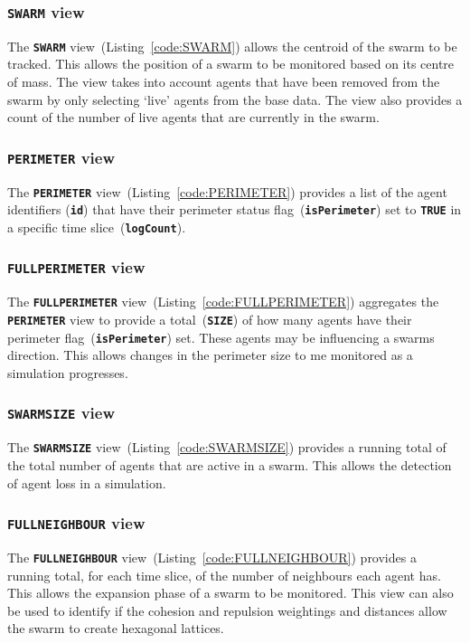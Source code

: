 \subsubsection{\texttt{\textbf{SWARM}} view}
The \texttt{\textbf{SWARM}} view~(Listing~\ref{code:SWARM}) allows the centroid of the swarm to be tracked. This allows the position of a swarm to be monitored based on its centre of mass. The view takes into account agents that have been removed from the swarm by only selecting `live' agents from the base data. The view also provides a count of the number of live agents that are currently in the swarm.

\subsubsection{\texttt{\textbf{PERIMETER}} view}
The \texttt{\textbf{PERIMETER}} view~(Listing~\ref{code:PERIMETER}) provides a list of the agent identifiers (\texttt{\textbf{id}}) that have their perimeter status flag~(\texttt{\textbf{isPerimeter}}) set to \texttt{\textbf{TRUE}} in a specific time slice~(\texttt{\textbf{logCount}}).

\subsubsection{\texttt{\textbf{FULLPERIMETER}} view}
The \texttt{\textbf{FULLPERIMETER}} view~(Listing~\ref{code:FULLPERIMETER}) aggregates the \texttt{\textbf{PERIMETER}} view to provide a total~(\texttt{\textbf{SIZE}}) of how many agents have their perimeter flag~(\texttt{\textbf{isPerimeter}}) set. These agents may be influencing a swarms direction. This allows changes in the perimeter size to me monitored as a simulation progresses.

\subsubsection{\texttt{\textbf{SWARMSIZE}} view}
The \texttt{\textbf{SWARMSIZE}} view~(Listing~\ref{code:SWARMSIZE}) provides a running total of the total number of agents that are active in a swarm. This allows the detection of agent loss in a simulation.

\subsubsection{\texttt{\textbf{FULLNEIGHBOUR}} view}
The \texttt{\textbf{FULLNEIGHBOUR}} view~(Listing~\ref{code:FULLNEIGHBOUR}) provides a running total, for each time slice, of the number of neighbours each agent has. This allows the expansion phase of a swarm to be monitored. This view can also be used to identify if the cohesion and repulsion weightings and distances allow the swarm to create hexagonal lattices.

